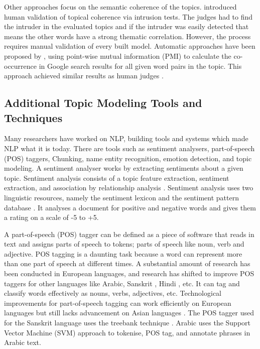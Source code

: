 Other approaches focus on the semantic coherence of the topics.  introduced human validation of topical coherence via intrusion tests. The judges had to find the intruder in the evaluated topics and if the intruder was easily detected that means the other words have a strong thematic correlation. However, the process requires manual validation of every built model. Automatic approaches have been proposed by , using point-wise mutual information (PMI) to calculate the co-occurrence in Google search results for all given word pairs in the topic. This approach achieved similar results as human judges \cite{AlSumait2009}.

\subsection{Additional Topic Modeling Tools and Techniques}

Many researchers have worked on NLP, building tools and systems which made NLP what it is today. There are tools such as sentiment analysers, part-of-speech (POS) taggers, Chunking, name entity recognition, emotion detection, and topic modeling. A sentiment analyser works by extracting sentiments about a given topic. Sentiment analysis consists of a topic feature extraction, sentiment extraction, and association by relationship analysis \cite{yi2003sentiment}. Sentiment analysis uses two linguistic resources, namely the sentiment lexicon and the sentiment pattern database \cite{nasukawa2003sentiment}. It analyses a document for positive and negative words and gives them a rating on a scale of -5 to +5.

A part-of-speech (POS) tagger can be defined as a piece of software that reads in text and assigns parts of speech to tokens; parts of speech like noun, verb and adjective. POS tagging is a daunting task because a word can represent more than one part of speech at different times. A substantial amount of research has been conducted in European languages, and research has shifted to improve POS taggers for other languages like Arabic, Sanskrit \cite{tapaswi2012treebank}, Hindi \cite{ranjan2003part}, etc. It can tag and classify words effectively as nouns, verbs, adjectives, etc. Technological improvements for part-of-speech tagging can work efficiently on European languages but still lacks advancement on Asian languages \cite{hirschberg2015advances}. The POS tagger used for the Sanskrit language uses the treebank technique \cite{bengoetxea2010application}. Arabic uses the Support Vector Machine (SVM) \cite{diab2004automatic} approach to tokenise, POS tag, and annotate phrases in Arabic text.

